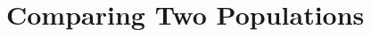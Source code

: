 \documentclass[%
 aip,
 jmp,%
 amsmath,amssymb,
 reprint,%
]{revtex4-1}
\begin{document}




\section{Comparing Two Populations}
\end{document}
